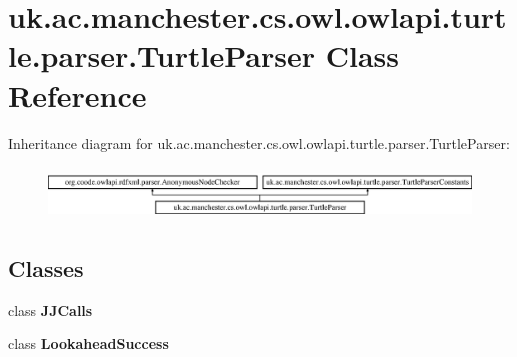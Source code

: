 \hypertarget{classuk_1_1ac_1_1manchester_1_1cs_1_1owl_1_1owlapi_1_1turtle_1_1parser_1_1_turtle_parser}{\section{uk.\-ac.\-manchester.\-cs.\-owl.\-owlapi.\-turtle.\-parser.\-Turtle\-Parser Class Reference}
\label{classuk_1_1ac_1_1manchester_1_1cs_1_1owl_1_1owlapi_1_1turtle_1_1parser_1_1_turtle_parser}
}
Inheritance diagram for uk.\-ac.\-manchester.\-cs.\-owl.\-owlapi.\-turtle.\-parser.\-Turtle\-Parser\-:\begin{figure}[H]
\begin{center}
\leavevmode
\includegraphics[height=1.393035cm]{classuk_1_1ac_1_1manchester_1_1cs_1_1owl_1_1owlapi_1_1turtle_1_1parser_1_1_turtle_parser}
\end{center}
\end{figure}
\subsection*{Classes}
\begin{DoxyCompactItemize}
\item 
class {\bfseries J\-J\-Calls}
\item 
class {\bfseries Lookahead\-Success}
\end{DoxyCompactItemize}
